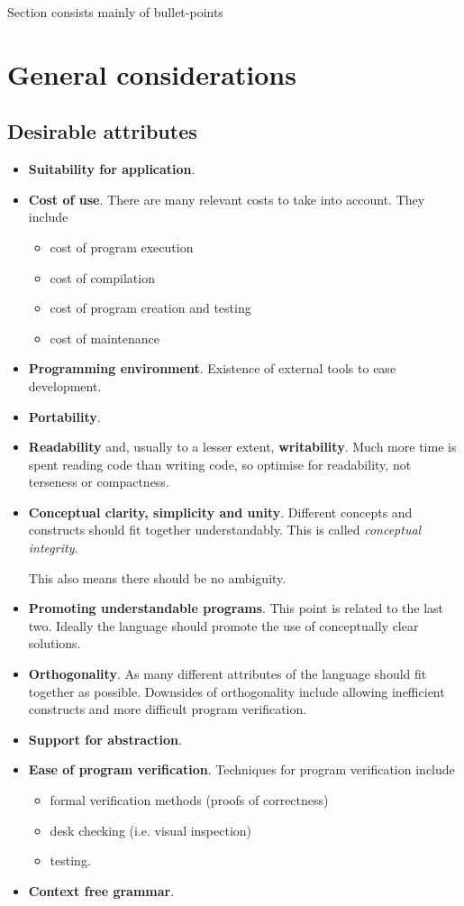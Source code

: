 Section consists mainly of bullet-points
\section{General considerations}
\subsection{Desirable attributes}
\begin{itemize}
\item \textbf{Suitability for application}.
\item \textbf{Cost of use}. There are many relevant costs to take into account. They include
\begin{itemize}
\item cost of program execution
\item cost of compilation
\item cost of program creation and testing
\item cost of maintenance
\end{itemize}
\item \textbf{Programming environment}. Existence of external tools to ease development.
\item \textbf{Portability}.

\item \textbf{Readability} and, usually to a lesser extent, \textbf{writability}. Much more time is spent reading code than writing code, so optimise for readability, not terseness or compactness.

\item \textbf{Conceptual clarity, simplicity and unity}. Different concepts and constructs should fit together understandably. This is called \emph{conceptual integrity}.

This also means there should be no ambiguity.

\item \textbf{Promoting understandable programs}. This point is related to the last two. Ideally the language should promote the use of conceptually clear solutions.

\item \textbf{Orthogonality}. As many different attributes of the language should fit together as possible. Downsides of orthogonality include allowing inefficient constructs and more difficult program verification.

\item \textbf{Support for abstraction}.
\item \textbf{Ease of program verification}. Techniques for program verification include
\begin{itemize}
\item formal verification methods (proofs of correctness)
\item desk checking (i.e. visual inspection)
\item testing.
\end{itemize}
\item \textbf{Context free grammar}. 
\end{itemize}

